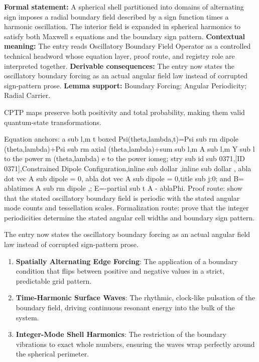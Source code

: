 \begingroup\footnotesize\setlength{\emergencystretch}{3em}\sloppy
\textbf{Formal statement:} A spherical shell partitioned into domains of alternating sign imposes a radial boundary field described by a sign function times a harmonic oscillation. The interior field is expanded in spherical harmonics to satisfy both Maxwell s equations and the boundary sign pattern. \textbf{Contextual meaning:} The entry reads Oscillatory Boundary Field Operator as a controlled technical headword whose equation layer, proof route, and registry role are interpreted together. \textbf{Derivable consequences:} The entry now states the oscillatory boundary forcing as an actual angular field law instead of corrupted sign-pattern prose. \textbf{Lemma support:} Boundary Forcing; Angular Periodicity; Radial Carrier.\par
\endgroup

CPTP maps preserve both positivity and total probability, making them valid quantum-state transformations.

Equation anchors: a sub l,m t boxed Psi(theta,lambda,t)=Psi sub rm dipole (theta,lambda)+Psi sub rm axial (theta,lambda)+sum sub l,m A sub l,m Y sub l to the power m (theta,lambda) e to the power iomeg; stry sub id sub 0371,[ID 0371],Constrained Dipole Configuration,inline sub dollar ,inline sub dollar , abla dot vec A sub dipole = 0, abla dot vec A sub dipole = 0,title sub j:0; and B= ablatimes A sub rm dipole ,; E=-partial sub t A - ablaPhi. Proof route: show that the stated oscillatory boundary field is periodic with the stated angular mode counts and tessellation scales. Formalization route: prove that the integer periodicities determine the stated angular cell widths and boundary sign pattern.

The entry now states the oscillatory boundary forcing as an actual angular field law instead of corrupted sign-pattern prose.
\endgroup

\begin{enumerate}[leftmargin=1.6em,itemsep=6pt,topsep=4pt]
\item \textbf{Spatially Alternating Edge Forcing}: The application of a boundary condition that flips between positive and negative values in a strict, predictable grid pattern.
\item \textbf{Time-Harmonic Surface Waves}: The rhythmic, clock-like pulsation of the boundary field, driving continuous resonant energy into the bulk of the system.
\item \textbf{Integer-Mode Shell Harmonics}: The restriction of the boundary vibrations to exact whole numbers, ensuring the waves wrap perfectly around the spherical perimeter.
\end{enumerate}


